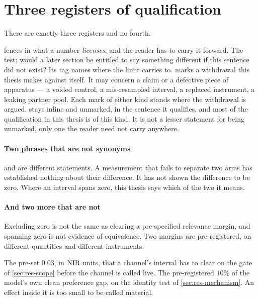 \section*{Three registers of qualification}

\noindent
There are exactly three registers and no fourth.

\begin{description}[leftmargin=1em, itemsep=0.5ex,
                    font=\normalfont\bfseries]
 fences in what a number \emph{licenses}, and
  the reader has to carry it forward. The test: would a later section be
  entitled to say something different if this sentence did not exist? Its tag
  names where the limit carries to.
 marks a withdrawal this thesis makes against
  itself. It may concern a claim or a defective piece of
  apparatus --- a voided control, a mis-resampled interval, a replaced
  instrument, a leaking partner pool. Each mark of either kind stands where the
  withdrawal is argued.
 stays inline and unmarked, in the
  sentence it qualifies, and most of the qualification in this thesis is of this
  kind. It is not a lesser statement for being unmarked, only one the reader
  need not carry anywhere.
\end{description}

\paragraph{Two phrases that are not synonyms} \notestablished and \shownzero
are different statements.
A measurement that fails to separate two arms has established nothing about
their difference. It has not shown the difference to be zero. Where an interval
spans zero, this thesis says which of the two it means.

\paragraph{And two more that are not} Excluding zero is not the same as clearing a
pre-spec\-i\-fied relevance margin, and spanning zero is not evidence of
equivalence. Two margins are pre-registered, on different quantities and
different instruments.

\begin{description}[leftmargin=1em, itemsep=0.5ex,
                    font=\normalfont\bfseries]
 The pre-set $0.03$, in $\textrm{NIR}$ units, that
  a channel's interval has to clear on the gate of \cref{sec:res-scope} before
  the channel is called live.
 The pre-registered $10\%$ of the model's
  own clean preference gap, on the identity test of \cref{sec:res-mechanism}. An
  effect inside it is too small to be called material.
\end{description}

